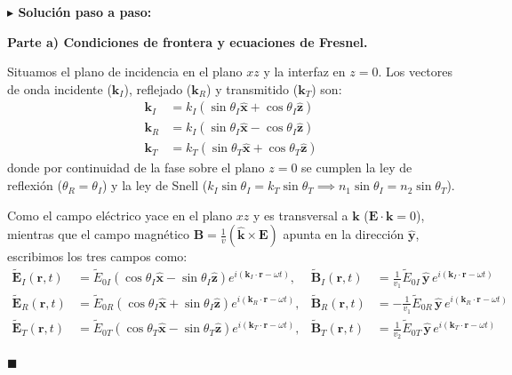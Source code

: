 \documentclass[11pt,a4paper]{book}
\newenvironment{solucion}{%
    \par\medskip\noindent\textbf{\color{blue!65!black}\Large $\blacktriangleright$ Solución paso a paso:}\par\medskip
}{%
    \hfill$\blacksquare$\par\bigskip
}
\newcommand{\xhat}{\hat{\bm{x}}}
\newcommand{\yhat}{\hat{\bm{y}}}
\newcommand{\zhat}{\hat{\bm{z}}}
\newcommand{\Evec}{\bm{E}}
\newcommand{\Bvec}{\bm{B}}
\begin{document}
\begin{solucion}
\textbf{Parte a) Condiciones de frontera y ecuaciones de Fresnel.}

Situamos el plano de incidencia en el plano $xz$ y la interfaz en $z = 0$. Los vectores de onda incidente ($\bm{k}_I$), reflejado ($\bm{k}_R$) y transmitido ($\bm{k}_T$) son:
\begin{align}
    \bm{k}_I &= k_I (\sin\theta_I \xhat + \cos\theta_I \zhat) \\
    \bm{k}_R &= k_I (\sin\theta_I \xhat - \cos\theta_I \zhat) \\
    \bm{k}_T &= k_T (\sin\theta_T \xhat + \cos\theta_T \zhat)
\end{align}
donde por continuidad de la fase sobre el plano $z=0$ se cumplen la ley de reflexión ($\theta_R = \theta_I$) y la ley de Snell ($k_I\sin\theta_I = k_T\sin\theta_T \implies n_1\sin\theta_I = n_2\sin\theta_T$).

Como el campo eléctrico yace en el plano $xz$ y es transversal a $\bm{k}$ ($\Evec \cdot \bm{k} = 0$), mientras que el campo magnético $\Bvec = \frac{1}{v}(\hat{\bm{k}} \times \Evec)$ apunta en la dirección $\yhat$, escribimos los tres campos como:
\begin{align}
    \tilde{\Evec}_I(\bm{r},t) &= \tilde{E}_{0I} (\cos\theta_I \xhat - \sin\theta_I \zhat) e^{i(\bm{k}_I\cdot\bm{r} - \omega t)}, & \tilde{\Bvec}_I(\bm{r},t) &= \frac{1}{v_1}\tilde{E}_{0I}\,\yhat\,e^{i(\bm{k}_I\cdot\bm{r} - \omega t)} \\
    \tilde{\Evec}_R(\bm{r},t) &= \tilde{E}_{0R} (\cos\theta_I \xhat + \sin\theta_I \zhat) e^{i(\bm{k}_R\cdot\bm{r} - \omega t)}, & \tilde{\Bvec}_R(\bm{r},t) &= -\frac{1}{v_1}\tilde{E}_{0R}\,\yhat\,e^{i(\bm{k}_R\cdot\bm{r} - \omega t)} \\
    \tilde{\Evec}_T(\bm{r},t) &= \tilde{E}_{0T} (\cos\theta_T \xhat - \sin\theta_T \zhat) e^{i(\bm{k}_T\cdot\bm{r} - \omega t)}, & \tilde{\Bvec}_T(\bm{r},t) &= \frac{1}{v_2}\tilde{E}_{0T}\,\yhat\,e^{i(\bm{k}_T\cdot\bm{r} - \omega t)}
\end{align}


\end{solucion}
\end{document}
